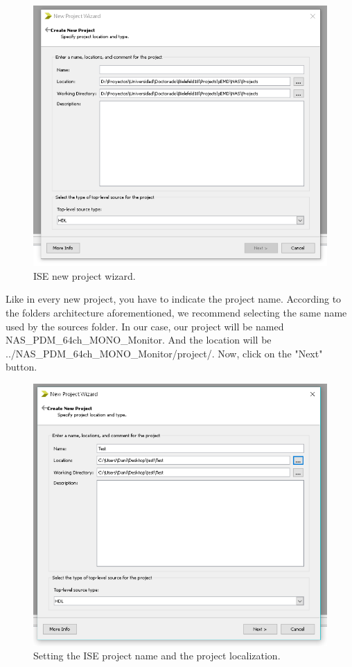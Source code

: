 \begin{figure}[H]
\centering
\includegraphics[width=1\textwidth]{images/Img29_NewProject_Wizard.PNG}
\caption{\label{fig:ISE_project_wizard}ISE new project wizard.}
\end{figure}

Like in every new project, you have to indicate the project name. According to the folders architecture aforementioned, we recommend selecting the same name used by the sources folder. In our case, our project will be named NAS\_PDM\_64ch\_MONO\_Monitor. And the location will be ../NAS\_PDM\_64ch\_MONO\_Monitor/project/. Now, click on the "Next" button.

\begin{figure}[H]
\centering
\includegraphics[width=1\textwidth]{images/Img30_NewProject_Wizard_bis.PNG}
\caption{\label{fig:ISE_name_location_project}Setting the ISE project name and the project localization.}
\end{figure}

